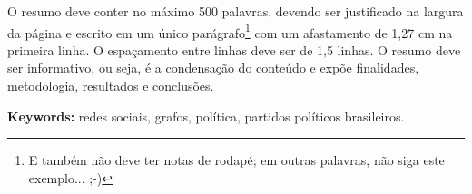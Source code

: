 O resumo deve conter no máximo 500 palavras, devendo ser justificado na largura da página e escrito em um único parágrafo\footnote{E também não deve ter notas de rodapé; em outras palavras, não siga este exemplo... ;-)} com um afastamento de 1,27 cm na primeira linha. O espaçamento entre linhas deve ser de 1,5 linhas. O resumo deve ser informativo, ou seja, é a condensação do conteúdo e expõe finalidades, metodologia, resultados e conclusões.

\textbf{Keywords:} redes sociais, grafos, política, partidos políticos brasileiros.
